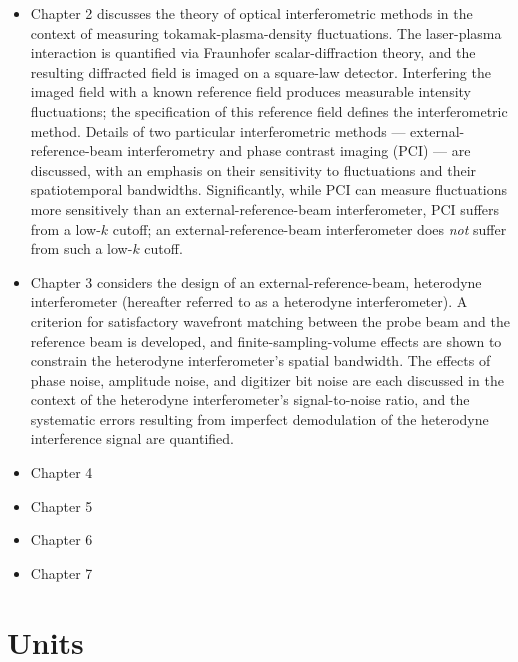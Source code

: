 \begin{itemize}
  \item Chapter 2 discusses the theory of optical interferometric methods
    in the context of measuring tokamak-plasma-density fluctuations.
    The laser-plasma interaction is quantified via
    Fraunhofer scalar-diffraction theory, and
    the resulting diffracted field is imaged on a square-law detector.
    Interfering the imaged field with a known reference field
    produces measurable intensity fluctuations;
    the specification of this reference field
    defines the interferometric method.
    Details of two particular interferometric methods ---
    external-reference-beam interferometry and
    phase contrast imaging (PCI) ---
    are discussed, with an emphasis on
    their sensitivity to fluctuations and their spatiotemporal bandwidths.
    Significantly, while PCI can measure fluctuations more sensitively
    than an external-reference-beam interferometer,
    PCI suffers from a low-$k$ cutoff;
    an external-reference-beam interferometer
    does \emph{not} suffer from such a low-$k$ cutoff.
  \item Chapter 3 considers the design of an
    external-reference-beam, heterodyne interferometer
    (hereafter referred to as a heterodyne interferometer).
    A criterion for satisfactory wavefront matching
    between the probe beam and the reference beam is developed, and
    finite-sampling-volume effects are shown
    to constrain the heterodyne interferometer's spatial bandwidth.
    The effects of phase noise, amplitude noise, and digitizer bit noise
    are each discussed in the context of
    the heterodyne interferometer's signal-to-noise ratio, and
    the systematic errors resulting from
    imperfect demodulation of the heterodyne interference signal
    are quantified.
  \item Chapter 4
  \item Chapter 5
  \item Chapter 6
  \item Chapter 7
\end{itemize}


\section{Units}
